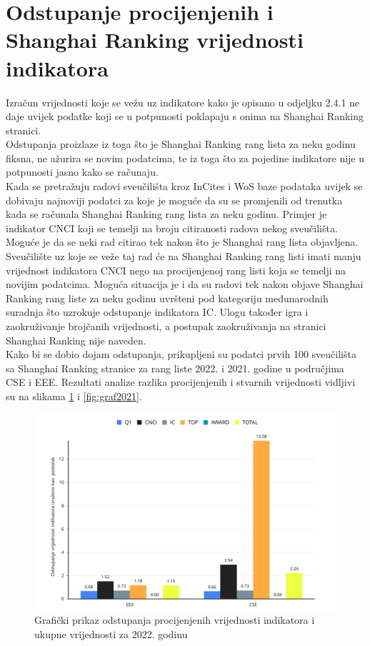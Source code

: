 \documentclass[times, utf8, zavrsni]{fer}
\begin{document}
\section{Odstupanje procijenjenih i Shanghai Ranking vrijednosti indikatora}
Izračun vrijednosti koje se vežu uz indikatore kako je opisano u odjeljku 2.4.1 ne daje uvijek podatke koji se u potpunosti poklapaju s onima na 
Shanghai Ranking stranici.
\\Odstupanja proizlaze iz toga što je Shanghai Ranking rang lista za neku godinu fiksna, ne ažurira se novim podatcima, te iz toga što za pojedine 
indikatore nije u potpunosti jasno kako se računaju. \\Kada se pretražuju radovi sveučilišta
kroz InCites i WoS baze podataka uvijek se dobivaju najnoviji podatci za koje je moguće da su se promjenili od trenutka kada se računala Shanghai Ranking rang lista za neku godinu.
Primjer je indikator CNCI koji se temelji na broju citiranosti radova nekog sveučilišta. Moguće je da se neki rad citirao tek nakon što je Shanghai rang lista objavljena. Sveučilište uz 
koje se veže taj rad će na Shanghai Ranking rang listi imati manju vrijednost indikatora CNCI nego na procijenjenoj rang listi koja se temelji na novijim podatcima. 
Moguća situacija je i da su radovi tek nakon objave Shanghai Ranking rang liste za neku godinu uvršteni pod kategoriju međunarodnih suradnja što uzrokuje odstupanje 
indikatora IC. Ulogu također igra i zaokruživanje brojčanih vrijednosti, a postupak zaokruživanja na stranici Shanghai Ranking nije naveden.
\\Kako bi se dobio dojam odstupanja, prikupljeni su podatci prvih 100 sveučilišta sa Shanghai Ranking stranice za rang liste 2022. i 2021. godine u područjima CSE i EEE. 
Rezultati analize razlika procijenjenih i stvarnih vrijednosti vidljivi su na slikama \ref{fig:graf2022} i \ref{fig:graf2021}.
\begin{figure}[htb]
    \centering
    \includegraphics[scale=0.31]{EEE2022.png}
    \caption{Grafički prikaz odstupanja procijenjenih vrijednosti indikatora i ukupne vrijednosti  za 2022. godinu}
    \label{fig:graf2022}
    \end{figure}
    \FloatBarrier
\end{document}
